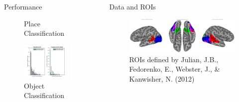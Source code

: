 \documentclass[final]{beamer}
\newlength{\sepwid}
\newlength{\introcolwid}
\begin{document}
\begin{frame}[t]
\begin{columns}[t]
\begin{column}{\introcolwid}
\begin{block}{Performance}
\begin{figure}
				\caption{Place Classification}
			\end{figure}
			\begin{figure}
				\includegraphics[width=\textwidth]{figures/Objects_WithinBeyond.png}
				\caption{Object Classification}
			\end{figure}
  		\end{block}
   	\end{column}

    \begin{column}{\sepwid}\end{column}			%
    \begin{column}{\introcolwid}					  %
		\begin{block}{Data and ROIs}
			\begin{figure}
				\includegraphics[width=\textwidth]{figures/ROIs.png}
				\caption{ROIs defined by Julian, J.B., Fedorenko, E., Webster, J., \& Kanwisher, N. (2012)}
			\end{figure}
		\end{block}
		

\end{column}
\end{columns}
\end{frame}
\end{document}
